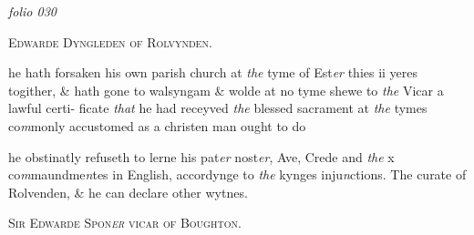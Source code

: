 \documentclass[12pt, a4paper]{book}
\begin{document}
\textit{folio 030}


            
               
				\begin{center} \begin{large} {\scshape Edwarde Dyngleden of Rolvynden.} \end{large} \end{center}
			

            	
            		
				\marginpar[\vspace{0.5cm}{\textcolor{Gray}{pilgrimages}}]{}
			
            		
				\marginpar[\vspace{0.5cm}{\textcolor{Gray}{n}}]{}
			
            		
		\ifthenelse{\isodd{\thepage}}
		{\reversemarginpar}
		{\normalmarginpar}
		 he hath forsaken his own parish church at \textit{the} tyme of
 Est\textit{er} thies ii yeres togither, \& hath gone to walsyngam
 \& wolde at no tyme shewe to \textit{the} Vicar a lawful certi-
 ficate \textit{that} he had receyved \textit{the} blessed sacrament at \textit{the}
 tymes co\textit{m}monly accustomed as a christen man ought to do
	
		
			
		
		\ifthenelse{\isodd{\thepage}}
		{\reversemarginpar}
		{\normalmarginpar}
		he obstinatly refuseth to lerne his pat\textit{er} nost\textit{er}, Ave, Crede and
 \textit{the} x co\textit{m}maundme\textit{n}tes in English, accordynge to \textit{the} kynges
 inju\textit{n}ctions. The curate of Rolvenden, \& he can declare other wytnes.
	
 

            
               
				\begin{center} \begin{large} {\scshape Sir Edwarde Spon\textit{er} vicar of Boughton.} \end{large} \end{center}
			


				\marginpar[\vspace{0.5cm}{\textcolor{Gray}{ceremonies}}]{}
			
				\marginpar[\vspace{0.5cm}{\textcolor{Gray}{n}}]{}
			
\end{document}
